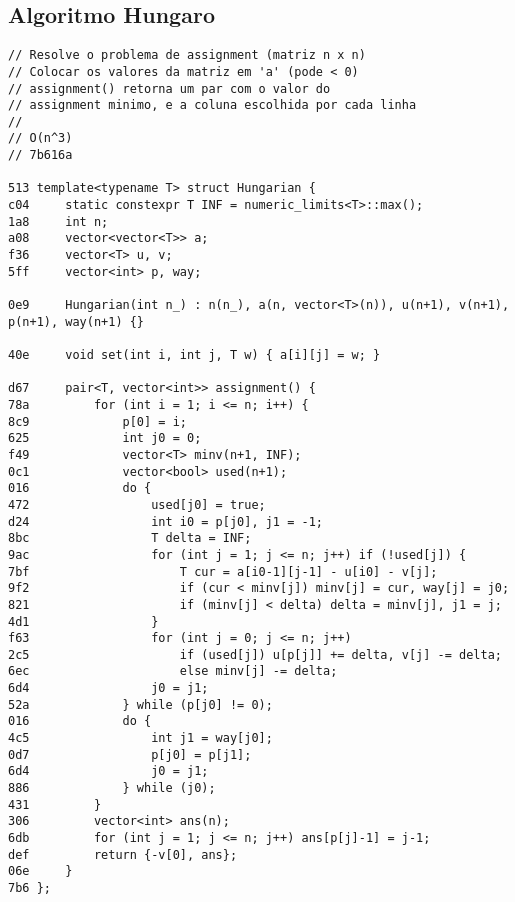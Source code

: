 \documentclass[11pt, a4paper, twoside]{article}
\begin{document}
\subsection{Algoritmo Hungaro}
\begin{lstlisting}
// Resolve o problema de assignment (matriz n x n)
// Colocar os valores da matriz em 'a' (pode < 0)
// assignment() retorna um par com o valor do
// assignment minimo, e a coluna escolhida por cada linha
//
// O(n^3)
// 7b616a

513 template<typename T> struct Hungarian {
c04 	static constexpr T INF = numeric_limits<T>::max();
1a8 	int n;
a08 	vector<vector<T>> a;
f36 	vector<T> u, v;
5ff 	vector<int> p, way;
    
0e9 	Hungarian(int n_) : n(n_), a(n, vector<T>(n)), u(n+1), v(n+1), p(n+1), way(n+1) {}
    
40e 	void set(int i, int j, T w) { a[i][j] = w; }
    
d67 	pair<T, vector<int>> assignment() {
78a 		for (int i = 1; i <= n; i++) {
8c9 			p[0] = i;
625 			int j0 = 0;
f49 			vector<T> minv(n+1, INF);
0c1 			vector<bool> used(n+1);
016 			do {
472 				used[j0] = true;
d24 				int i0 = p[j0], j1 = -1;
8bc 				T delta = INF;
9ac 				for (int j = 1; j <= n; j++) if (!used[j]) {
7bf 					T cur = a[i0-1][j-1] - u[i0] - v[j];
9f2 					if (cur < minv[j]) minv[j] = cur, way[j] = j0;
821 					if (minv[j] < delta) delta = minv[j], j1 = j;
4d1 				}
f63 				for (int j = 0; j <= n; j++)
2c5 					if (used[j]) u[p[j]] += delta, v[j] -= delta;
6ec 					else minv[j] -= delta;
6d4 				j0 = j1;
52a 			} while (p[j0] != 0);
016 			do {
4c5 				int j1 = way[j0];
0d7 				p[j0] = p[j1];
6d4 				j0 = j1;
886 			} while (j0);
431 		}
306 		vector<int> ans(n);
6db 		for (int j = 1; j <= n; j++) ans[p[j]-1] = j-1;
def 		return {-v[0], ans};
06e 	}
7b6 };
\end{lstlisting}
\end{document}
